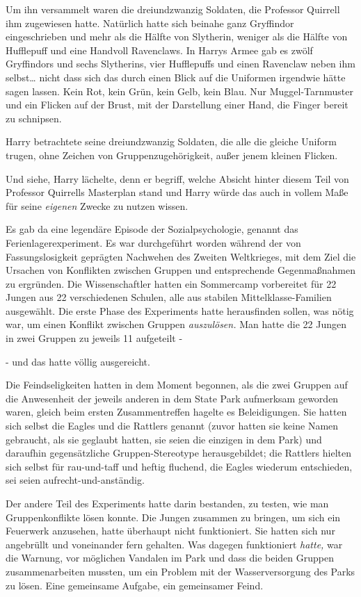 {Um ihn versammelt waren die dreiundzwanzig Soldaten, die Professor Quirrell ihm zugewiesen hatte. Natürlich hatte sich beinahe ganz Gryffindor eingeschrieben und mehr als die Hälfte von Slytherin, weniger als die Hälfte von Hufflepuff und eine Handvoll Ravenclaws. In Harrys Armee gab es zwölf Gryffindors und sechs Slytherins, vier Hufflepuffs und einen Ravenclaw neben ihm selbst… nicht dass sich das durch einen Blick auf die Uniformen irgendwie hätte sagen lassen. Kein Rot, kein Grün, kein Gelb, kein Blau. Nur Muggel-Tarnmuster und ein Flicken auf der Brust, mit der Darstellung einer Hand, die Finger bereit zu schnipsen.

Harry betrachtete seine dreiundzwanzig Soldaten, die alle die gleiche Uniform trugen, ohne Zeichen von Gruppenzugehörigkeit, außer jenem kleinen Flicken.

Und siehe, Harry lächelte, denn er begriff, welche Absicht hinter diesem Teil von Professor Quirrells Masterplan stand und Harry würde das auch in vollem Maße für seine \emph{eigenen} Zwecke zu nutzen wissen.

Es gab da eine legendäre Episode der Sozialpsychologie, genannt das Ferienlagerexperiment. Es war durchgeführt worden während der von Fassungslosigkeit geprägten Nachwehen des Zweiten Weltkrieges, mit dem Ziel die Ursachen von Konflikten zwischen Gruppen und entsprechende Gegenmaßnahmen zu ergründen. Die Wissenschaftler hatten ein Sommercamp vorbereitet für 22 Jungen aus 22 verschiedenen Schulen, alle aus stabilen Mittelklasse-Familien ausgewählt. Die erste Phase des Experiments hatte herausfinden sollen, was nötig war, um einen Konflikt zwischen Gruppen \emph{auszulösen.} Man hatte die 22 Jungen in zwei Gruppen zu jeweils 11 aufgeteilt -

- und das hatte völlig ausgereicht.

Die Feindseligkeiten hatten in dem Moment begonnen, als die zwei Gruppen auf die Anwesenheit der jeweils anderen in dem State Park aufmerksam geworden waren, gleich beim ersten Zusammentreffen hagelte es Beleidigungen. Sie hatten sich selbst die Eagles und die Rattlers genannt (zuvor hatten sie keine Namen gebraucht, als sie geglaubt hatten, sie seien die einzigen in dem Park) und daraufhin gegensätzliche Gruppen-Stereotype herausgebildet; die Rattlers hielten sich selbst für rau-und-taff und heftig fluchend, die Eagles wiederum entschieden, sei seien aufrecht-und-anständig.

Der andere Teil des Experiments hatte darin bestanden, zu testen, wie man Gruppenkonflikte lösen konnte. Die Jungen zusammen zu bringen, um sich ein Feuerwerk anzusehen, hatte überhaupt nicht funktioniert. Sie hatten sich nur angebrüllt und voneinander fern gehalten. Was dagegen funktioniert \emph{hatte,} war die Warnung, vor möglichen Vandalen im Park und dass die beiden Gruppen zusammenarbeiten mussten, um ein Problem mit der Wasserversorgung des Parks zu lösen. Eine gemeinsame Aufgabe, ein gemeinsamer Feind.

}
